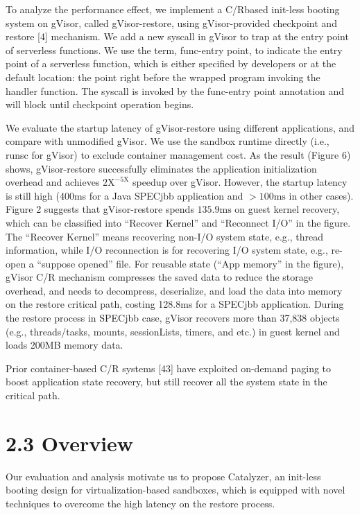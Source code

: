 \documentclass[
  10
]{article}
\begin{document}
To analyze the performance effect, we implement a C/Rbased init-less
booting system on gVisor, called gVisor-restore, using gVisor-provided
checkpoint and restore {[}4{]} mechanism. We add a new syscall in gVisor
to trap at the entry point of serverless functions. We use the term,
func-entry point, to indicate the entry point of a serverless function,
which is either specified by developers or at the default location: the
point right before the wrapped program invoking the handler function.
The syscall is invoked by the func-entry point annotation and will block
until checkpoint operation begins.

We evaluate the startup latency of gVisor-restore using different
applications, and compare with unmodified gVisor. We use the sandbox
runtime directly (i.e., runsc for gVisor) to exclude container
management cost. As the result (Figure 6) shows, gVisor-restore
successfully eliminates the application initialization overhead and
achieves \(2 \mathrm { X } ^ { - 5 \mathrm { X } }\) speedup over
gVisor. However, the startup latency is still high (400ms for a Java
SPECjbb application and \({ > } 1 0 0 \mathrm { m s }\) in other cases).
Figure 2 suggests that gVisor-restore spends
\(1 3 5 . 9 \mathrm { m s }\) on guest kernel recovery, which can be
classified into ``Recover Kernel'' and ``Reconnect I/O'' in the figure.
The ``Recover Kernel'' means recovering non-I/O system state, e.g.,
thread information, while I/O reconnection is for recovering I/O system
state, e.g., re-open a ``suppose opened'' file. For reusable state
(``App memory'' in the figure), gVisor C/R mechanism compresses the
saved data to reduce the storage overhead, and needs to decompress,
deserialize, and load the data into memory on the restore critical path,
costing 128.8ms for a SPECjbb application. During the restore process in
SPECjbb case, gVisor recovers more than 37,838 objects (e.g.,
threads/tasks, mounts, sessionLists, timers, and etc.) in guest kernel
and loads 200MB memory data.

Prior container-based C/R systems {[}43{]} have exploited on-demand
paging to boost application state recovery, but still recover all the
system state in the critical path.

\section{2.3 Overview}\label{overview}

Our evaluation and analysis motivate us to propose Catalyzer, an
init-less booting design for virtualization-based sandboxes, which is
equipped with novel techniques to overcome the high latency on the
restore process.
\end{document}
